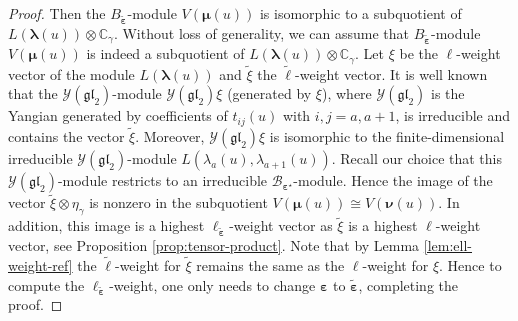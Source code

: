 \documentclass[11pt,reqno]{amsart}
\numberwithin{equation}{section}
\theoremstyle{definition}
\theoremstyle{remark}
\newcommand{\gl}{\mathfrak{gl}}
\newcommand{\bC}{\mathbb{C}}
\newcommand{\tl}{\tilde}
\newcommand{\la}{\lambda}
\newcommand{\bla}{\bm\lambda}
\newcommand{\ve}{\varepsilon}
\newcommand{\s}{{\bm s}}
\begin{document}
\begin{proof}
Then the $B_{\tl{\bm\ve}}$-module $V(\bm\mu(u))$ is isomorphic to a subquotient of $L(\bla(u))\otimes \bC_\gamma$. Without loss of generality, we can assume that $B_{\tl{\bm\ve}}$-module $V(\bm\mu(u))$ is indeed a subquotient of $L(\bla(u))\otimes \bC_\gamma$. Let $\xi$ be the $\ell$-weight vector of the module $L(\bla(u))$ and $\tl\xi$ the $\tl\ell$-weight vector. It is well known that the $\mathscr Y(\gl_2)$-module $\mathscr Y(\gl_2)\xi$ (generated by $\xi$), where $\mathscr Y(\gl_2)$ is the Yangian generated by coefficients of $t_{ij}(u)$ with $i,j=a,a+1$, is irreducible and contains the vector $\tl\xi$. Moreover, $\mathscr Y(\gl_2)\xi$ is isomorphic to the finite-dimensional irreducible $\mathscr{Y}(\gl_2)$-module $L(\la_a(u),\la_{a+1}(u))$. Recall our choice that this $\mathscr Y(\gl_2)$-module restricts to an irreducible $\mathscr B_{\bm\ve^\star}$-module. Hence the image of the vector $\tl\xi\otimes \eta_\gamma$ is nonzero in the subquotient $V(\bm\mu(u))\cong V(\bm\nu(u))$. In addition, this image is a highest $\ell_{\tl{\bm\ve}}$-weight vector as $\tl\xi$ is a highest $\ell$-weight vector, see Proposition \ref{prop:tensor-product}. Note that by Lemma \ref{lem:ell-weight-ref} the $\tl\ell$-weight for $\tl\xi$ remains the same as the $\ell$-weight for $\xi$. Hence to compute the $\ell_{\tl{\bm\ve}}$-weight, one only needs to change  $\bm\ve$ to $\tl{\bm\ve}$, completing the proof.
\end{proof}
\end{document}
